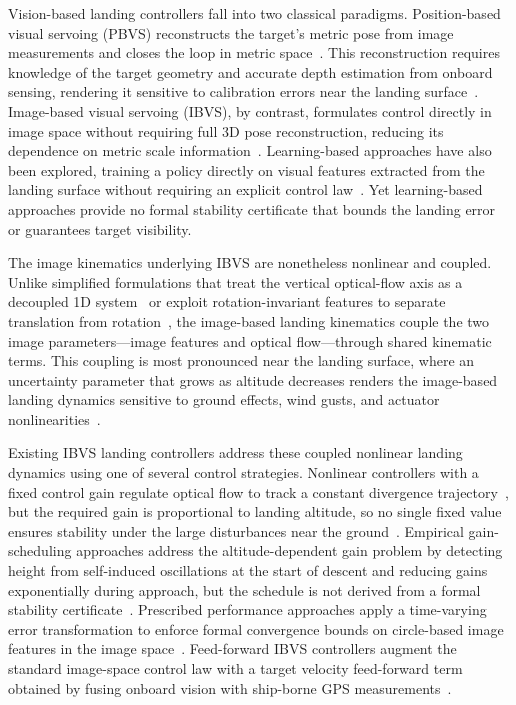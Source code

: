 \documentclass{IEEEtaes}
\begin{document}
Vision-based landing controllers fall into two classical paradigms. Position-based visual servoing (PBVS) reconstructs the target's metric pose from image measurements and closes the loop in metric space~\cite{lin2022,zhang2026}. This reconstruction requires knowledge of the target geometry and accurate depth estimation from onboard sensing, rendering it sensitive to calibration errors near the landing surface~\cite{lin2022,zhao2021}. Image-based visual servoing (IBVS), by contrast, formulates control directly in image space without requiring full 3D pose reconstruction, reducing its dependence on metric scale information~\cite{lin2023,cho2022}. Learning-based approaches have also been explored, training a policy directly on visual features extracted from the landing surface without requiring an explicit control law~\cite{angelis2026}. Yet learning-based approaches provide no formal stability certificate that bounds the landing error or guarantees target visibility.

The image kinematics underlying IBVS are nonetheless nonlinear and coupled. Unlike simplified formulations that treat the vertical optical-flow axis as a decoupled 1D system~\cite{herisse2012} or exploit rotation-invariant features to separate translation from rotation~\cite{lin2023}, the image-based landing kinematics couple the two image parameters---image features and optical flow---through shared kinematic terms. This coupling is most pronounced near the landing surface, where an uncertainty parameter that grows as altitude decreases renders the image-based landing dynamics sensitive to ground effects, wind gusts, and actuator nonlinearities~\cite{herisse2012,ho2018}.

Existing IBVS landing controllers address these coupled nonlinear landing dynamics using one of several control strategies. Nonlinear controllers with a fixed control gain regulate optical flow to track a constant divergence trajectory~\cite{herisse2012}, but the required gain is proportional to landing altitude, so no single fixed value ensures stability under the large disturbances near the ground~\cite{ho2018}. Empirical gain-scheduling approaches address the altitude-dependent gain problem by detecting height from self-induced oscillations at the start of descent and reducing gains exponentially during approach, but the schedule is not derived from a formal stability certificate~\cite{ho2018}. Prescribed performance approaches apply a time-varying error transformation to enforce formal convergence bounds on circle-based image features in the image space~\cite{lin2023}. Feed-forward IBVS controllers augment the standard image-space control law with a target velocity feed-forward term obtained by fusing onboard vision with ship-borne GPS measurements~\cite{cho2022}.
\end{document}
